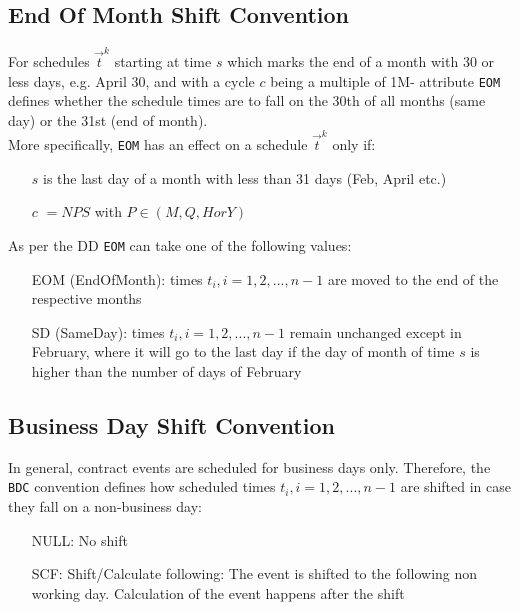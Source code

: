 \documentclass[9pt,oneside]{amsart}
\newcommand{\attr}[1]{\texttt{#1}}
\begin{document}
\begin{multicols}{2}
\subsection{End Of Month Shift Convention}\label{sec:eomc}

For schedules $\vec{t}^k$ starting at time $s$ which marks the end of a month with 30 or less days, e.g. April 30, and with a cycle $c$ being a multiple of 1M- attribute \attr{EOM} defines whether the schedule times are to fall on the 30th of all months (same day) or the 31st (end of month).\\

More specifically, \attr{EOM} has an effect on a schedule $\vec{t}^k$ only if:

\begin{itemize}
	\item[$s$] is the last day of a month with less than 31 days (Feb, April etc.)

	\item[$c$] $=NPS$ with $P\in(M, Q, H or Y)$
\end{itemize}

As per the DD \attr{EOM} can take one of the following values:
\begin{itemize}
	\item[EOM] (EndOfMonth): times $t_i,i=1,2,...,n-1$ are moved to the end of the respective months

	\item[SD] (SameDay): times $t_i,i=1,2,...,n-1$ remain unchanged except in February, where it will go to the last day if the day of month of time $s$ is higher than the number of days of February
\end{itemize}


\subsection{Business Day Shift Convention}\label{sec:bdc}

In general, contract events are scheduled for business days only. Therefore, the \attr{BDC} convention defines how scheduled times $t_i,i=1,2,...,n-1$ are shifted in case they fall on a non-business day:

\begin{itemize}
	\item[NULL:] No shift

	\item[SCF:] Shift/Calculate following: The event is shifted to the following non working day. Calculation of the event happens after the shift


\end{itemize}
\end{multicols}
\end{document}
